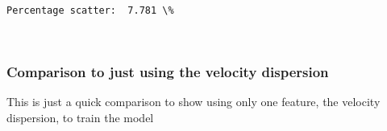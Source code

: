 \documentclass[11pt]{article}
\begin{document}
    \begin{Verbatim}[commandchars=\\\{\}]
Percentage scatter:  7.781 \%

    \end{Verbatim}

    \begin{center}
    \end{center}
    { \hspace*{\fill} \\}
    
    \subsubsection{Comparison to just using the velocity
dispersion}\label{comparison-to-just-using-the-velocity-dispersion}

This is just a quick comparison to show using only one feature, the
velocity dispersion, to train the model
\end{document}
